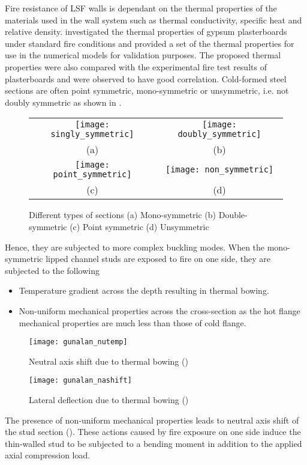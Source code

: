 Fire resistance of LSF walls is dependant on the thermal properties of the materials used in the wall system such as thermal conductivity, specific heat and relative density. \citet{Keerthan2012} investigated the thermal properties of gypsum plasterboards under standard fire conditions and provided a set of the thermal properties for use in the numerical models for validation purposes. The proposed thermal properties were also compared with the experimental fire test results of plasterboards and were observed to have good correlation. Cold-formed steel sections are often point symmetric, mono-symmetric or unsymmetric, i.e. not doubly symmetric as shown in . 
\begin{figure}[!htbp]
	\centering
		\begin{tabular}{cc}
			\texttt{[image: singly\_symmetric]} & \texttt{[image: doubly\_symmetric]} \\ 
			(a) & (b)  \\ 
			\texttt{[image: point\_symmetric]} & \texttt{[image: non\_symmetric]} \\ 
			(c) & (d)  \\
		\end{tabular} 
		\caption{Different types of sections (a) Mono-symmetric (b) Double-symmetric (c) Point symmetric (d) Unsymmetric}
		\label{fig:symmetry}
\end{figure}
Hence, they are subjected to more complex buckling modes. When the mono-symmetric lipped channel studs are exposed to fire on one side, they are subjected to the following
\begin{itemize}
	\item Temperature gradient across the depth resulting in thermal bowing.
	\item Non-uniform mechanical properties across the cross-section as the hot flange mechanical properties are much less than those of cold flange.
\end{itemize}
\begin{figure}[htbp]
	\centering	
		\texttt{[image: gunalan\_nutemp]}
		\caption{Neutral axis shift due to thermal bowing (\cite{Gunalan2014j})}
		\label{fig:gunalan_nutemp}
\end{figure}
\begin{figure}[htbp]
	\centering	
		\texttt{[image: gunalan\_nashift]}
		\caption{Lateral deflection due to thermal bowing (\cite{Gunalan2014j})}
		\label{fig:gunalan_nashift}
\end{figure}
The presence of non-uniform mechanical properties leads to neutral axis shift of the stud section (). These actions caused by fire exposure on one side induce the thin-walled stud to be subjected to a bending moment in addition to the applied axial compression load.

